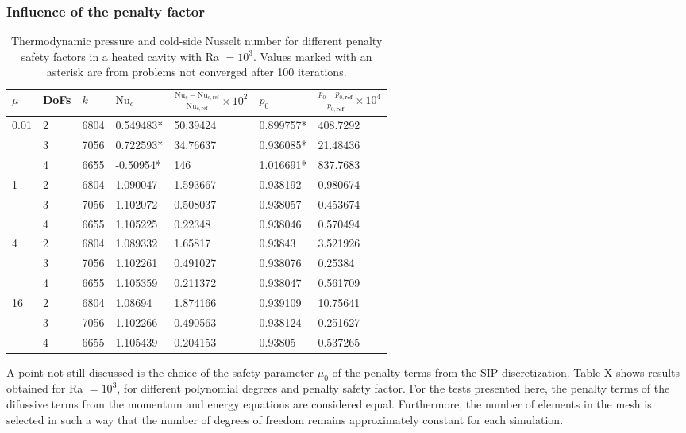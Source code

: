 \subsubsection{Influence of the penalty factor}
\begin{table}[h]
\centering
\begin{tabular}{lllllll}
	\hline \vspace{0.1cm}
		$\mu$                  & DoFs & $k$ & $\text{Nu}_c$ &  $\frac{\text{Nu}_c - \text{Nu}_{c,\text{ref}}} {\text{Nu}_{c,\text{ref}}}\times 10^2 $   & $p_0$    & $\frac{p_0 - p_{0,\textbf{ref}}} {p_{0,\textbf{ref} }}\times 10^4 $ \\ \hline
\multirow{3}{*}{0.01} & 2 & 6804 & 0.549483* & 50.39424 & 0.899757* & 408.7292 \\
                      & 3 & 7056 & 0.722593* & 34.76637 & 0.936085* & 21.48436 \\
                      & 4 & 6655 & -0.50954* & 146      & 1.016691* & 837.7683 \\ \hline
\multirow{3}{*}{1}    & 2 & 6804 & 1.090047 & 1.593667 & 0.938192 & 0.980674 \\
                      & 3 & 7056 & 1.102072 & 0.508037 & 0.938057 & 0.453674 \\
                      & 4 & 6655 & 1.105225 & 0.22348  & 0.938046 & 0.570494 \\ \hline
\multirow{3}{*}{4}    & 2 & 6804 & 1.089332 & 1.65817  & 0.93843  & 3.521926 \\
                      & 3 & 7056 & 1.102261 & 0.491027 & 0.938076 & 0.25384  \\
                      & 4 & 6655 & 1.105359 & 0.211372 & 0.938047 & 0.561709 \\ \hline
\multirow{3}{*}{16}   & 2 & 6804 & 1.08694  & 1.874166 & 0.939109 & 10.75641 \\
                      & 3 & 7056 & 1.102266 & 0.490563 & 0.938124 & 0.251627 \\
                      & 4 & 6655 & 1.105439 & 0.204153 & 0.93805  & 0.537265 \\ \hline
\end{tabular}
\caption[Thermodynamic pressure and cold-side Nusselt number for different penalty safety factors in a heated cavity with Ra $=10^3$.]{Thermodynamic pressure and cold-side Nusselt number for different penalty safety factors in a heated cavity with Ra $=10^3$. Values marked with an asterisk are from problems not converged after 100 iterations.}
\end{table}
A point not still discussed is the choice of the safety parameter $\mu_0$ of the penalty terms from the SIP discretization.  Table X shows results obtained for Ra $=10^3$, for different polynomial degrees and penalty safety factor.  For the tests presented here, the penalty terms of the difussive terms from the momentum and energy equations are considered equal. Furthermore, the number of elements in the mesh is selected in such a way that the number of degrees of freedom remains approximately constant for each simulation. 

